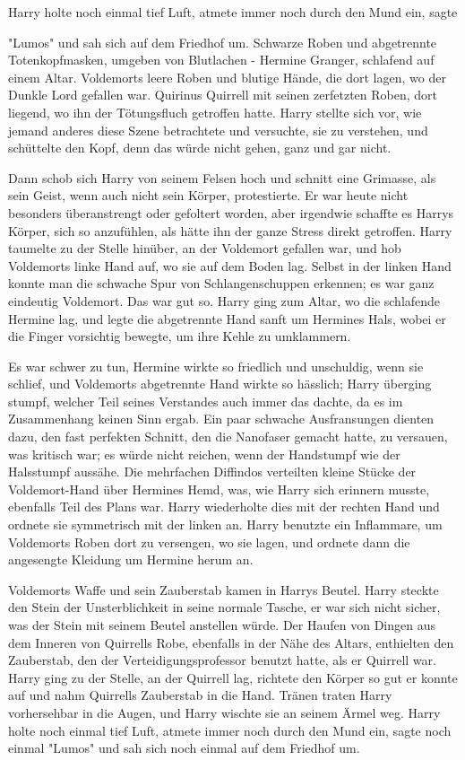 {Harry holte noch einmal tief Luft, atmete immer noch durch den Mund ein, sagte

"Lumos" und sah sich auf dem Friedhof um. Schwarze Roben und abgetrennte Totenkopfmasken, umgeben von Blutlachen - Hermine Granger, schlafend auf einem Altar. Voldemorts leere Roben und blutige Hände, die dort lagen, wo der Dunkle Lord gefallen war. Quirinus Quirrell mit seinen zerfetzten Roben, dort liegend, wo ihn der Tötungsfluch getroffen hatte. Harry stellte sich vor, wie jemand anderes diese Szene betrachtete und versuchte, sie zu verstehen, und schüttelte den Kopf, denn das würde nicht gehen, ganz und gar nicht.

Dann schob sich Harry von seinem Felsen hoch und schnitt eine Grimasse, als sein Geist, wenn auch nicht sein Körper, protestierte. Er war heute nicht besonders überanstrengt oder gefoltert worden, aber irgendwie schaffte es Harrys Körper, sich so anzufühlen, als hätte ihn der ganze Stress direkt getroffen. Harry taumelte zu der Stelle hinüber, an der Voldemort gefallen war, und hob Voldemorts linke Hand auf, wo sie auf dem Boden lag. Selbst in der linken Hand konnte man die schwache Spur von Schlangenschuppen erkennen; es war ganz eindeutig Voldemort. Das war gut so. Harry ging zum Altar, wo die schlafende Hermine lag, und legte die abgetrennte Hand sanft um Hermines Hals, wobei er die Finger vorsichtig bewegte, um ihre Kehle zu umklammern.

Es war schwer zu tun, Hermine wirkte so friedlich und unschuldig, wenn sie schlief, und Voldemorts abgetrennte Hand wirkte so hässlich; Harry überging stumpf, welcher Teil seines Verstandes auch immer das dachte, da es im Zusammenhang keinen Sinn ergab. Ein paar schwache Ausfransungen dienten dazu, den fast perfekten Schnitt, den die Nanofaser gemacht hatte, zu versauen, was kritisch war; es würde nicht reichen, wenn der Handstumpf wie der Halsstumpf aussähe. Die mehrfachen Diffindos verteilten kleine Stücke der Voldemort-Hand über Hermines Hemd, was, wie Harry sich erinnern musste, ebenfalls Teil des Plans war. Harry wiederholte dies mit der rechten Hand und ordnete sie symmetrisch mit der linken an. Harry benutzte ein Inflammare, um Voldemorts Roben dort zu versengen, wo sie lagen, und ordnete dann die angesengte Kleidung um Hermine herum an.

Voldemorts Waffe und sein Zauberstab kamen in Harrys Beutel. Harry steckte den Stein der Unsterblichkeit in seine normale Tasche, er war sich nicht sicher, was der Stein mit seinem Beutel anstellen würde. Der Haufen von Dingen aus dem Inneren von Quirrells Robe, ebenfalls in der Nähe des Altars, enthielten den Zauberstab, den der Verteidigungsprofessor benutzt hatte, als er Quirrell war. Harry ging zu der Stelle, an der Quirrell lag, richtete den Körper so gut er konnte auf und nahm Quirrells Zauberstab in die Hand. Tränen traten Harry vorhersehbar in die Augen, und Harry wischte sie an seinem Ärmel weg. Harry holte noch einmal tief Luft, atmete immer noch durch den Mund ein, sagte noch einmal "Lumos" und sah sich noch einmal auf dem Friedhof um.

}
